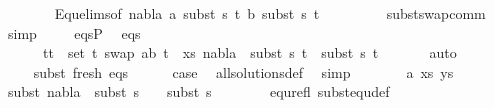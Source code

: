 \begin{isabellebody}
\ \ \ \ \ \isamarkupfalse%
\ {}\ Equ{\isacharunderscore}{\kern0pt}elims{\isacharparenleft}{\kern0pt}{}{\isacharparenright}{\kern0pt}{\isacharbrackleft}{\kern0pt}of\ nabla{}\ a\ {\isacartoucheopen}subst\ s{}\ t{}{\isacartoucheclose}\ b\ {\isacartoucheopen}subst\ s{}\ t{}{\isacartoucheclose}{\isacharbrackright}{\kern0pt}\ \ \isanewline
\ \ \ \ \ \ \ subst{\isacharunderscore}{\kern0pt}swap{\isacharunderscore}{\kern0pt}comm\ \isamarkupfalse%
\ simp\isanewline
\ \ \ \isamarkupfalse%
\ eqsP{}\ \isamarkupfalse%
\ eqs{\isacharcolon}{\kern0pt}\ \isanewline
\ \ \ \ \ {\isachardoublequoteopen}{\isasymforall}\ {\isacharparenleft}{\kern0pt}t{}{\isacharcomma}{\kern0pt}t{}{\isacharparenright}{\kern0pt}\ {\isasymin}\ set\ {\isacharparenleft}{\kern0pt}{\isacharparenleft}{\kern0pt}t{}{\isacharcomma}{\kern0pt}\ swap\ {\isacharbrackleft}{\kern0pt}{\isacharparenleft}{\kern0pt}a{\isacharcomma}{\kern0pt}b{\isacharparenright}{\kern0pt}{\isacharbrackright}{\kern0pt}\ t{}{\isacharparenright}{\kern0pt}\ {\isacharhash}{\kern0pt}\ xs{\isacharparenright}{\kern0pt}{\isachardot}{\kern0pt}\ nabla{}\ {\isasymturnstile}\ subst\ s{}\ t{}\ {\isasymapprox}\ subst\ s{}\ t{}{\isachardoublequoteclose}\isanewline
\ \ \ \ \ \isamarkupfalse%
\ auto\isanewline
\ \ \ \ \isanewline
\ \ \ \isamarkupfalse%
\ subst\ fresh\ eqs\ \isanewline
\ \ \ \isamarkupfalse%
\ {\isacharquery}{\kern0pt}case\ \isamarkupfalse%
\ all{\isacharunderscore}{\kern0pt}solutions{\isacharunderscore}{\kern0pt}def\ \isamarkupfalse%
\ simp\isanewline
\ \isamarkupfalse%
\isanewline
\ \ \ \isamarkupfalse%
\ {\isacharparenleft}{\kern0pt}{}\ a\ xs\ ys{\isacharparenright}{\kern0pt}\isanewline
\ \ \ \isamarkupfalse%
\ \isamarkupfalse%
\ subst{\isacharcolon}{\kern0pt}\ {\isachardoublequoteopen}nabla{}\ {\isasymTurnstile}\ subst\ {\isacharparenleft}{\kern0pt}s{}\ {\isasymbullet}\ {\isacharbrackleft}{\kern0pt}{\isacharbrackright}{\kern0pt}{\isacharparenright}{\kern0pt}\ {\isasymapprox}\ subst\ s{}{\isachardoublequoteclose}\ \isanewline
\ \ \ \ \ \isamarkupfalse%
\ equ{\isacharunderscore}{\kern0pt}refl\ subst{\isacharunderscore}{\kern0pt}equ{\isacharunderscore}{\kern0pt}def\ \isamarkupfalse%

\end{isabellebody}

